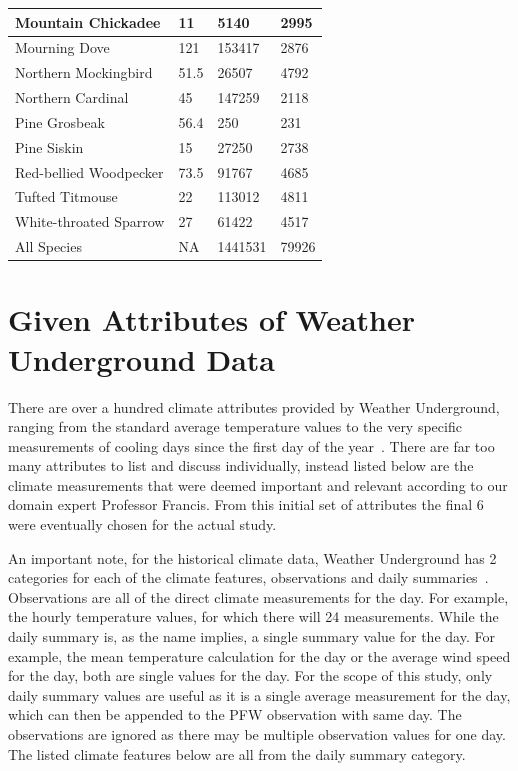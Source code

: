 \begin{longtable}[c]{|l|l|l|l|}
Mountain Chickadee        & 11                & 5140             & 2995          \\ \hline
Mourning Dove             & 121               & 153417           & 2876          \\ \hline
Northern Mockingbird      & 51.5              & 26507            & 4792          \\ \hline
Northern Cardinal         & 45                & 147259           & 2118          \\ \hline
Pine Grosbeak             & 56.4              & 250              & 231           \\ \hline
Pine Siskin               & 15                & 27250            & 2738          \\ \hline
Red-bellied Woodpecker    & 73.5              & 91767            & 4685          \\ \hline
Tufted Titmouse           & 22                & 113012           & 4811          \\ \hline
White-throated Sparrow    & 27                & 61422            & 4517          \\ \hline
All Species               & NA                & 1441531          & 79926         \\ \hline
\end{longtable}


\section{Given Attributes of Weather Underground Data}

There are over a hundred climate attributes provided by Weather Underground, ranging from the standard average temperature values to the very specific measurements of cooling days since the first day of the year~\cite{WUAPI:online}. There are far too many attributes to list and discuss individually, instead listed below are the climate measurements that were deemed important and relevant according to our domain expert Professor Francis. From this initial set of attributes the final 6 were eventually chosen for the actual study.

An important note, for the historical climate data, Weather Underground has 2 categories for each of the climate features, observations and daily summaries~\cite{WUAPI:online}. Observations are all of the direct climate measurements for the day. For example, the hourly temperature values, for which there will 24 measurements. While the daily summary is, as the name implies, a single summary value for the day. For example, the mean temperature calculation for the day or the average wind speed for the day, both are single values for the day. For the scope of this study, only daily summary values are useful as it is a single average measurement for the day, which can then be appended to the PFW observation with same day. The observations are ignored as there may be multiple observation values for one day. The listed climate features below are all from the daily summary category.

